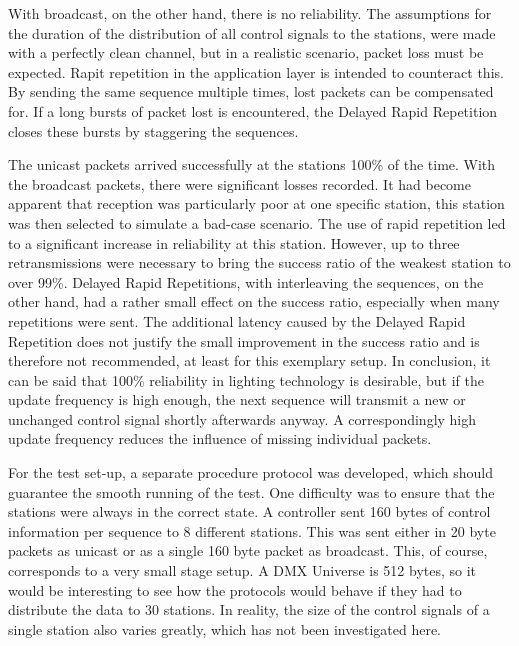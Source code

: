 With broadcast, on the other hand, there is no reliability.
The assumptions for the duration of the distribution of all control signals to the stations,
were made with a perfectly clean channel,
but in a realistic scenario, packet loss must be expected.
Rapit repetition in the application layer is intended to counteract this.
By sending the same sequence multiple times, lost packets can be compensated for.
If a long bursts of packet lost is encountered, 
the Delayed Rapid Repetition closes these bursts by staggering the sequences.

The unicast packets arrived successfully at the stations 100\% of the time.
With the broadcast packets, there were significant losses recorded.
It had become apparent that reception was particularly poor at one specific station,
this station was then selected to simulate a bad-case scenario.
The use of rapid repetition led to a significant increase in reliability at this station.
However, up to three retransmissions were necessary to bring the success ratio of the weakest station to over 99\%.
Delayed Rapid Repetitions, with interleaving the sequences, on the other hand, 
had a rather small effect on the success ratio,
especially when many repetitions were sent.
The additional latency caused by the Delayed Rapid Repetition
does not justify the small improvement in the success ratio and is therefore not recommended,
at least for this exemplary setup.
In conclusion, it can be said that 100\% reliability in lighting technology is desirable,
but if the update frequency is high enough,
the next sequence will transmit a new or unchanged control signal shortly afterwards anyway.
A correspondingly high update frequency reduces the influence of missing individual packets.

For the test set-up, a separate procedure protocol was developed,
which should guarantee the smooth running of the test.
One difficulty was to ensure that the stations were always in the correct state.
A controller sent 160 bytes of control information per sequence to 8 different stations.
This was sent either in 20 byte packets as unicast or as a single 160 byte packet as broadcast.
This, of course, corresponds to a very small stage setup.
A DMX Universe is 512 bytes, so it would be interesting to see
how the protocols would behave if they had to distribute the data to 30 stations.
In reality, the size of the control signals of a single station also varies greatly,
which has not been investigated here.

